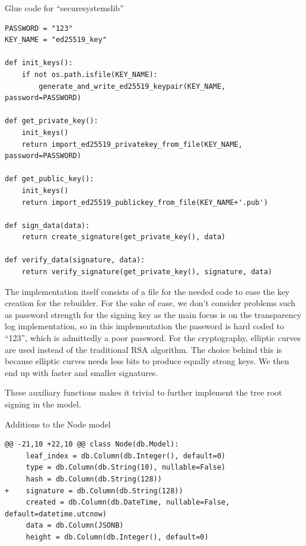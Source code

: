 \documentclass[../Main/thesis.tex]{subfiles}
\begin{document}
\begin{listing}[H]
\caption{Glue code for ``securesystemslib''}
\label{lst:securesystemslib_glue}
\begin{verbatim}
PASSWORD = "123"
KEY_NAME = "ed25519_key"

def init_keys():
    if not os.path.isfile(KEY_NAME):
        generate_and_write_ed25519_keypair(KEY_NAME, password=PASSWORD)

def get_private_key():
    init_keys()
    return import_ed25519_privatekey_from_file(KEY_NAME, password=PASSWORD)

def get_public_key():
    init_keys()
    return import_ed25519_publickey_from_file(KEY_NAME+'.pub')

def sign_data(data):
    return create_signature(get_private_key(), data)

def verify_data(signature, data):
    return verify_signature(get_private_key(), signature, data)
\end{verbatim}
\end{listing}

The implementation itself consists of a file for the needed code to ease the key
creation for the rebuilder. For the sake of ease, we don't consider problems
such as password strength for the signing key as the main focus is on the
transparency log implementation, so in this implementation the password is
hard coded to ``123'', which is admittedly a poor password. For the
cryptography, elliptic curves are used instead of the traditional RSA algorithm.
The choice behind this is because elliptic curves needs less bits to produce
equally strong keys. We then end up with faster and smaller signatures.

These auxiliary functions makes it trivial to further implement the tree root
signing in the model.

\begin{listing}[H]
\caption{Additions to the Node model}
\label{lst:node_tree_root_signature}
\begin{verbatim}
@@ -21,10 +22,10 @@ class Node(db.Model):
     leaf_index = db.Column(db.Integer(), default=0)
     type = db.Column(db.String(10), nullable=False)
     hash = db.Column(db.String(128))
+    signature = db.Column(db.String(128))
     created = db.Column(db.DateTime, nullable=False, default=datetime.utcnow)
     data = db.Column(JSONB)
     height = db.Column(db.Integer(), default=0)
\end{verbatim}
\end{listing}
\end{document}
